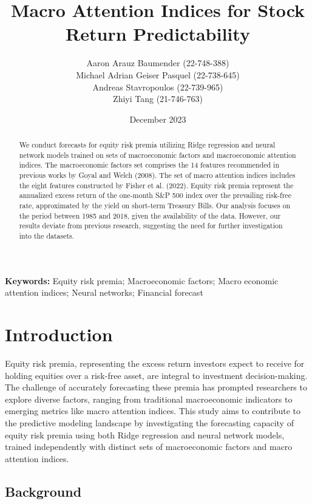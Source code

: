 \documentclass{article}
\title{Macro Attention Indices for Stock Return Predictability}
\author{Aaron Arauz Baumender (22-748-388) 
\\ Michael Adrian Geiser Pasquel (22-738-645)
\\ Andreas Stavropoulos (22-739-965)
\\ Zhiyi Tang (21-746-763)}
\affil{University of Zurich}
\date{December 2023}
\providecommand{\keywords}[1]{\small \textbf{Keywords:} #1}
\begin{document}
\maketitle

\begin{abstract} 
\noindent We conduct forecasts for equity risk premia utilizing Ridge regression and neural network models trained on sets of macroeconomic factors and macroeconomic attention indices. The macroeconomic factors set comprises the 14 features recommended in previous works by Goyal and Welch (2008). The set of macro attention indices includes the eight features constructed by Fisher et al. (2022). Equity risk premia represent the annualized excess return of the one-month S\&P 500 index over the prevailing risk-free rate, approximated by the yield on short-term Treasury Bills. Our analysis focuses on the period between 1985 and 2018, given the availability of the data. However, our results deviate from previous research, suggesting the need for further investigation into the datasets.
\end{abstract}

\hfill

\noindent \keywords{Equity risk premia; Macroeconomic factors; Macro economic attention indices; Neural networks; Financial forecast}\\

\newpage

\tableofcontents

\newpage

\section{Introduction}

Equity risk premia, representing the excess return investors expect to receive for holding equities over a risk-free asset, are integral to investment decision-making. The challenge of accurately forecasting these premia has prompted researchers to explore diverse factors, ranging from traditional macroeconomic indicators to emerging metrics like macro attention indices. This study aims to contribute to the predictive modeling landscape by investigating the forecasting capacity of equity risk premia using both Ridge regression and neural network models, trained independently with distinct sets of macroeconomic factors and macro attention indices.

\subsection{Background}
\end{document}
